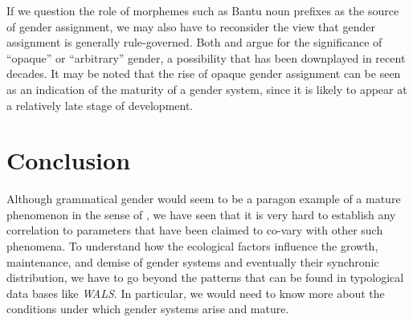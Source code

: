 \documentclass[output=collectionpaper]{langsci/langscibook}
\begin{document}
If we question the role of morphemes such as Bantu noun prefixes as the source of gender assignment, we may also have to reconsider the view that gender assignment is generally rule-governed. Both  and  argue for the significance of ``opaque'' or ``arbitrary'' gender, a possibility that has been downplayed in recent decades. It may be noted that the rise of opaque gender assignment can be seen as an indication of the maturity of a gender system, since it is likely to appear at a relatively late stage of development.

\section{Conclusion}

Although grammatical gender would seem to be a paragon example of a mature phenomenon in the sense of \citet{Dahl2004}, we have seen that it is very hard to establish any correlation to parameters that have been claimed to co-vary with other such phenomena. To understand how the ecological factors influence the growth, maintenance, and demise of gender systems and eventually their synchronic distribution, we have to go beyond the patterns that can be found in typological data bases like \textit{WALS}. In particular, we would need to know more about the conditions under which gender systems arise and mature.

\printbibliography[heading=subbibliography,notkeyword=this]



\label{lastpage:Dahl}
\end{document}

